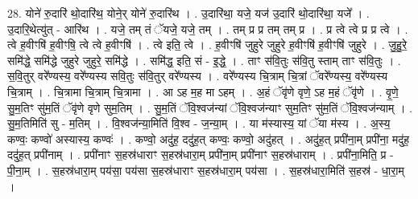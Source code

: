 \documentclass[17pt]{extarticle}
\begin{document}
28. योने॑ रु॒दारि॑ थो॒दारि॑थ॒ योने॒र् योने॑ रु॒दारि॑थ । . उ॒दारि॑था॒ यजे॒ यज॑ उ॒दारि॑ थो॒दारि॑था॒ यजे᳚ । . उ॒दारि॒थेत्यु॑त् - आरि॑थ । . यजे॒ तम् तं ॅयजे॒ यजे॒ तम् । . तम् प्र प्र तम् तम् प्र । . प्र त्वे त्वे प्र प्र त्वे । . त्वे ह॒वीꣳषि॑ ह॒वीꣳषि॒ त्वे त्वे ह॒वीꣳषि॑ । . त्वे इति॒ त्वे । . ह॒वीꣳषि॑ जुहुरे जुहुरे ह॒वीꣳषि॑ ह॒वीꣳषि॑ जुहुरे । . जु॒हु॒रे॒ समि॑द्धे॒ समि॑द्धे जुहुरे जुहुरे॒ समि॑द्धे । . समि॑द्ध॒ इति॒ सं - इ॒द्धे॒ । . ताꣳ स॑वि॒तुः स॑वि॒तु स्ताम् ताꣳ स॑वि॒तुः । . स॒वि॒तुर् वरे᳚ण्यस्य॒ वरे᳚ण्यस्य सवि॒तुः स॑वि॒तुर् वरे᳚ण्यस्य । . वरे᳚ण्यस्य चि॒त्राम् चि॒त्रां ॅवरे᳚ण्यस्य॒ वरे᳚ण्यस्य चि॒त्राम् । . चि॒त्रामा चि॒त्राम् चि॒त्रामा । . आ ऽह म॒ह मा ऽहम् । . अ॒हं ॅवृ॑णे वृणे॒ ऽह म॒हं ॅवृ॑णे । . वृ॒णे॒ सु॒म॒तिꣳ सु॑म॒तिं ॅवृ॑णे वृणे सुम॒तिम् । . सु॒म॒तिं ॅवि॒श्वज॑न्यां ॅवि॒श्वज॑न्याꣳ सुम॒तिꣳ सु॑म॒तिं ॅवि॒श्वज॑न्याम् । . सु॒म॒तिमिति॑ सु - म॒तिम् । . वि॒श्वज॑न्या॒मिति॑ वि॒श्व - ज॒न्या॒म् । . या म॑स्यास्य॒ यां ॅया म॑स्य । . अ॒स्य॒ कण्वः॒ कण्वो॑ अस्यास्य॒ कण्वः॑ । . कण्वो॒ अदु॑ह॒ ददु॑ह॒त् कण्वः॒ कण्वो॒ अदु॑हत् । . अदु॑ह॒त् प्रपी॑ना॒म् प्रपी॑ना॒ मदु॑ह॒ ददु॑ह॒त् प्रपी॑नाम् । . प्रपी॑नाꣳ स॒हस्र॑धाराꣳ स॒हस्र॑धारा॒म् प्रपी॑ना॒म् प्रपी॑नाꣳ स॒हस्र॑धाराम् । . प्रपी॑ना॒मिति॒ प्र - पी॒ना॒म् । . स॒हस्र॑धारा॒म् पय॑सा॒ पय॑सा स॒हस्र॑धाराꣳ स॒हस्र॑धारा॒म् पय॑सा । . स॒हस्र॑धारा॒मिति॑ स॒हस्र॑ - धा॒रा॒म् । \newline
\end{document}
